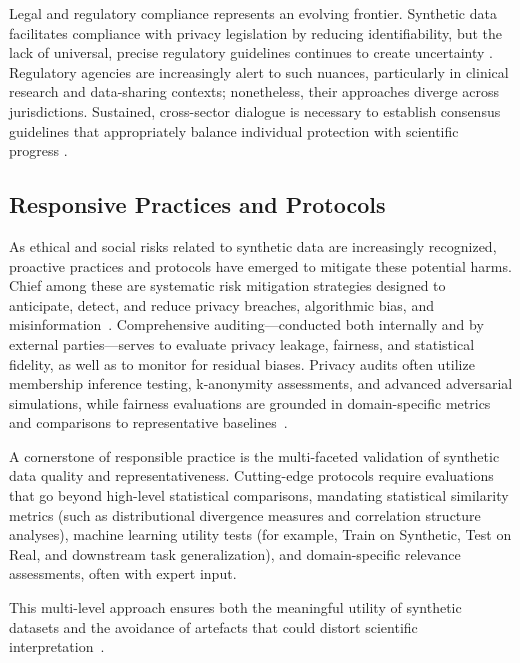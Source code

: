 \documentclass[sigconf]{acmart}
\begin{document}
Legal and regulatory compliance represents an evolving frontier. Synthetic data facilitates compliance with privacy legislation by reducing identifiability, but the lack of universal, precise regulatory guidelines continues to create uncertainty \cite{ref2}\cite{ref7}\cite{ref10}\cite{ref13}. Regulatory agencies are increasingly alert to such nuances, particularly in clinical research and data-sharing contexts; nonetheless, their approaches diverge across jurisdictions. Sustained, cross-sector dialogue is necessary to establish consensus guidelines that appropriately balance individual protection with scientific progress \cite{ref3}\cite{ref7}\cite{ref14}\cite{ref17}\cite{ref21}\cite{ref88}.

\subsection{Responsive Practices and Protocols}

As ethical and social risks related to synthetic data are increasingly recognized, proactive practices and protocols have emerged to mitigate these potential harms. Chief among these are systematic risk mitigation strategies designed to anticipate, detect, and reduce privacy breaches, algorithmic bias, and misinformation~\cite{ref81}\cite{ref82}\cite{ref88}. Comprehensive auditing—conducted both internally and by external parties—serves to evaluate privacy leakage, fairness, and statistical fidelity, as well as to monitor for residual biases. Privacy audits often utilize membership inference testing, k-anonymity assessments, and advanced adversarial simulations, while fairness evaluations are grounded in domain-specific metrics and comparisons to representative baselines~\cite{ref12}\cite{ref81}\cite{ref82}.

A cornerstone of responsible practice is the multi-faceted validation of synthetic data quality and representativeness. Cutting-edge protocols require evaluations that go beyond high-level statistical comparisons, mandating statistical similarity metrics (such as distributional divergence measures and correlation structure analyses), machine learning utility tests (for example, Train on Synthetic, Test on Real, and downstream task generalization), and domain-specific relevance assessments, often with expert input.

This multi-level approach ensures both the meaningful utility of synthetic datasets and the avoidance of artefacts that could distort scientific interpretation~\cite{ref6}\cite{ref11}\cite{ref75}\cite{ref81}\cite{ref89}.
\end{document}
